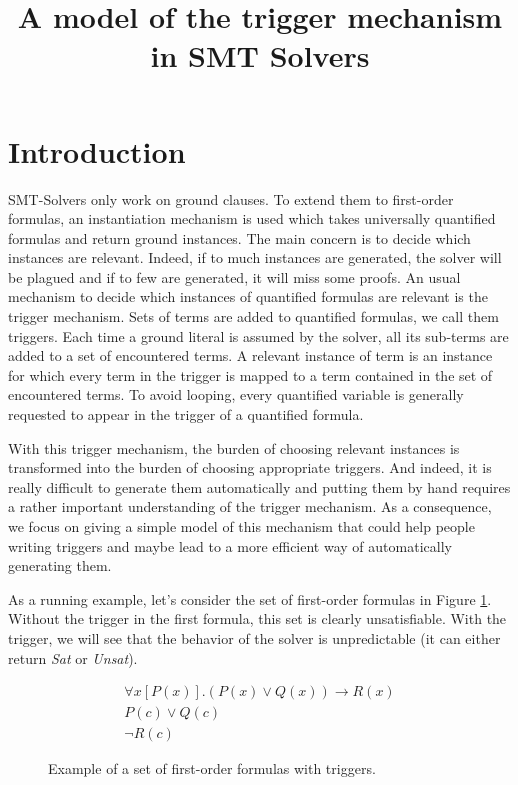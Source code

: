 \documentclass[a4paper,11pt]{article}
\title{A model of the trigger mechanism in SMT Solvers}
\author{}
\begin{document}
\maketitle

\begin{abstract}

\end{abstract}

\section{Introduction}
SMT-Solvers only work on ground clauses. To extend them to first-order formulas, an instantiation mechanism
is used which takes universally quantified formulas and return ground instances. The main concern is to
decide which instances are relevant. Indeed, if to much instances are generated, the solver will be plagued
and if to few are generated, it will miss some proofs. An usual mechanism to decide which instances of
quantified formulas are relevant is the trigger mechanism. Sets of terms are added to quantified formulas,
we call them triggers. Each time a ground literal is assumed by the solver, all its sub-terms are
added to a set of encountered terms. A relevant instance of term is an instance for which every term
in the trigger is mapped to a term contained in the set of encountered terms. To avoid looping,
every quantified variable is generally requested to appear in the trigger of a quantified formula.

With this trigger mechanism, the burden of choosing relevant instances is transformed into the
burden of choosing appropriate triggers. And indeed, it is really difficult to generate them
automatically and putting them by hand requires a rather important understanding of the
trigger mechanism. As a consequence, we focus on giving a simple model of this mechanism that could
help people writing triggers and maybe lead to a more efficient way of automatically generating them.

As a running example, let's consider the set of first-order formulas in Figure \ref{fo-ex}.
Without the trigger in the first formula, this set is clearly unsatisfiable. With the trigger,
we will see that the behavior of the solver is unpredictable (it can either return \emph{Sat}
or \emph{Unsat}).
\begin{figure}
 \begin{eqnarray*}
 \forall x[P(x)]. (P(x)\vee Q(x))\rightarrow R(x)\\
 P(c)\vee Q(c)\\
 \neg R(c)
\end{eqnarray*}
\caption{\label{fo-ex}Example of a set of first-order formulas with triggers.}
\end{figure}
\end{document}
